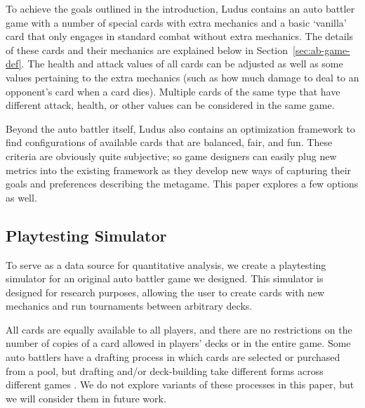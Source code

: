 
To achieve the goals outlined in the introduction, {\sc Ludus} contains an auto battler game with a number of special cards with extra mechanics and a basic `vanilla' card that only engages in standard combat without extra mechanics. The details of these cards and their mechanics are explained below in Section~\ref{sec:ab-game-def}. The health and attack values of all cards can be adjusted as well as some values pertaining to the extra mechanics (such as how much damage to deal to an opponent's card when a card dies). Multiple cards of the same type that have different attack, health, or other values can be considered in the same game. 

Beyond the auto battler itself, {\sc Ludus} also contains an optimization framework to find configurations of available cards that are balanced, fair, and fun. These criteria are obviously quite subjective; so game designers can easily plug new metrics into the existing framework as they develop new ways of capturing their goals and preferences describing the metagame. This paper explores a few options as well.

\subsection{Playtesting Simulator} \label{sec:sim}

To serve as a data source for quantitative analysis, we create
a playtesting simulator for an original auto battler game we designed. 
This simulator is designed for research purposes, allowing the user to 
create cards with new mechanics and run tournaments between
arbitrary decks. 

All cards are equally available to all players, and there are no restrictions on the number of copies of a card allowed in players' decks or in the entire game. Some auto battlers have a drafting process in which cards are selected or purchased from a pool, but drafting and/or deck-building take different forms across different games \cite{hearthstone-battlegrounds,storybook-brawl,feh-pawnsOfLoki-video}. We do not explore variants of these processes in this paper, but we will consider them in future work.

